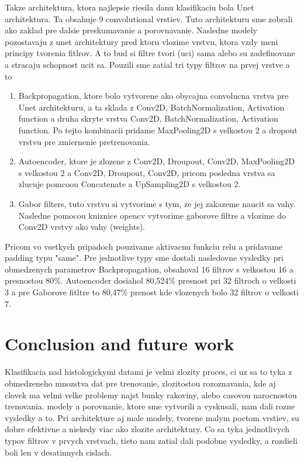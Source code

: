 \documentclass[runningheads]{llncs}
\begin{document}
Takze architektura, ktora najlepsie riesila danu klasifikaciu bola Unet architektura. 
Ta obsahuje 9 convolutional vrstiev. Tuto architekturu sme zobrali ako zaklad pre dalsie preskumavanie a porovnavanie. 
Nasledne modely pozostavaju z unet architektury pred ktoru vlozime vrstvu, ktora vzdy meni principy tvorenia fitlrov. 
A to bud si filtre tvori (uci) sama alebo su zadefinovane a stracaju schopnost ucit sa. 
Pouzili sme zatial tri typy filtrov na prvej vrstve a to 
\begin{enumerate}
\item Backpropagation, ktore bolo vytvorene ako obycajna convolucna vrstva pre Unet architekturu, a ta sklada z Conv2D, BatchNormalization, Activation function a druha skryte vrstva Conv2D, BatchNormalization, Activation function. Po tejto kombinacii pridame MaxPooling2D s velkostou 2 a dropout vrstvu pre zmiernenie pretrenovania.
\item Autoencoder, ktore je zlozene z Conv2D, Droupout, Conv2D, MaxPooling2D s velkostou 2 a Conv2D, Droupout, Conv2D, pricom posledna vrstva sa zlucuje pomcoou Concatenate a UpSampling2D s velkostou 2.
\item Gabor filters, tuto vrstvu si vytvorime s tym, ze jej zakazeme naucit sa vahy. Nasledne pomocou kniznice opencv vytvorime gaborove filtre a vlozime do Conv2D vrstvy ako vahy (weights).
\end{enumerate}
Pricom vo vsetkych pripadoch pouzivame aktivacnu funkciu relu a pridavame padding typu "same". 
Pre jednotlive typy sme dostali nasledovne vysledky pri obmedzenych parametrov Backpropagation, obsahoval 16 filtrov s velkostou 16 a presnostou 80\%. 
Autoencoder dosiahol 80,524\% presnost pri 32 filtroch o velkosti 3 a pre Gaborove fitltre to 80,47\% prenost kde vlozenych bolo 32 filtrov o velkosti 7. 

\section{Conclusion and future work}

Klasifikacia nad histologickymi datami je velmi zlozity proces, ci uz sa to tyka z obmedzeneho mnozstva dat pre trenovanie, zlozitostou rozoznavania, kde aj clovek ma velmi velke problemy najst bunky rakoviny, alebo casovou narocnostou trenovania. 
modely a porovnanie, ktore sme vytvorili a vyskusali, nam dali rozne vysledky a to. 
Pri architekture aj male modely, tvorene malym poctom vrstiev, su dobre efektivne a niekedy viac ako zlozite architektury. 
Co sa tyka jednotlivych typov filtrov v prvych vrstvach, tieto nam zatial dali podobne vysledky, a rozdieli boli len v desatinnych cislach. 
\end{document}
